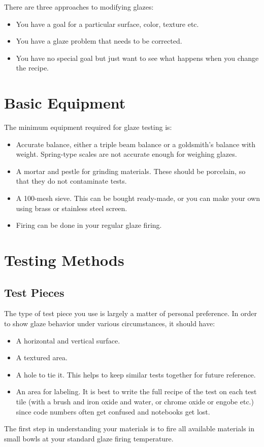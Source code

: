 There are three approaches to modifying glazes:
\begin{itemize}
\item You have a goal for a particular surface, color, texture etc.
\item You have a glaze problem that needs to be corrected.
\item You have no special goal but just want to see what happens when you 
change the recipe.
\end{itemize}
\section{Basic Equipment}
The minimum equipment required for glaze testing is:
\begin{itemize}
\item Accurate balance, either a triple beam balance or a goldsmith's balance 
with weight. Spring-type scales are not accurate enough for weighing glazes.
\item A mortar and pestle for grinding materials. These should be porcelain, so 
that they do not contaminate tests.
\item A 100-mesh sieve. This can be bought ready-made, or you can make your own 
using brass or stainless steel screen.
\item Firing can be done in your regular glaze firing.
\end{itemize}
\section{Testing Methods}
\subsection{Test Pieces}
The type of test piece you use is largely a matter of personal preference. In 
order to show glaze behavior under various circumstances, it should have:
\begin{itemize}
\item A horizontal and vertical surface.
\item A textured area.
\item A hole to tie it. This helps to keep similar tests together for future 
reference.
\item An area for labeling. It is best to write the full recipe of the test on 
each test tile (with a brush and iron oxide and water, or chrome oxide or 
engobe etc.) since code numbers often get confused and notebooks get lost.
\end{itemize}
The first step in understanding your materials is to fire all available 
materials in small bowls at your standard glaze firing temperature.

